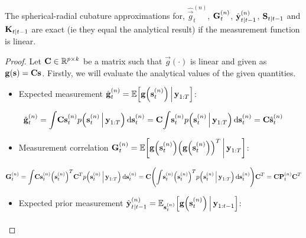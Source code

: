		\begin{theorem}
			The spherical-radial cubature approximations for, \( \hat{\vec{g}}_t^{(n)} \), \( \boldsymbol{\mathrm{G}}_t^{(n)} \), \( \hat{\boldsymbol{\mathrm{y}}}_{t \vert t - 1}^{(n)} \), \( \boldsymbol{\mathrm{S}}_{t \vert t - 1} \) and \( \boldsymbol{\mathrm{K}}_{t \vert t - 1} \) are exact (\ac{ie} they equal the analytical result) if the measurement function is linear.
		\end{theorem}
		\begin{proof}
			Let \( \boldsymbol{\mathrm{C}} \in \mathbb{R}^{p \times k} \) be a matrix such that \( \vec{g}(\cdot) \) is linear and given as \( \boldsymbol{\mathrm{g}}(\boldsymbol{\mathrm{s}}) = \boldsymbol{\mathrm{C}} \boldsymbol{\mathrm{s}} \). Firstly, we will evaluate the analytical values of the given quantities.
			\begin{itemize}
				\item Expected measurement \( \hat{\boldsymbol{\mathrm{g}}}_t^{(n)} = \mathbb{E}\Big[\boldsymbol{\mathrm{g}}\Big(\boldsymbol{\mathrm{s}}_t^{(n)}\Big) \,\Big\vert\, \boldsymbol{\mathrm{y}}_{1:T}\Big] \):
			\end{itemize}
			\begin{align*}
				\hat{\boldsymbol{\mathrm{g}}}_t^{(n)}
					= \int\! \boldsymbol{\mathrm{C}} \boldsymbol{\mathrm{s}}_t^{(n)} p\Big( \boldsymbol{\mathrm{s}}_t^{(n)} \,\Big\vert\, \boldsymbol{\mathrm{y}}_{1:T} \Big) \dd{\boldsymbol{\mathrm{s}}_t^{(n)}}
					= \boldsymbol{\mathrm{C}} \! \int\! \boldsymbol{\mathrm{s}}_t^{(n)} p\Big( \boldsymbol{\mathrm{s}}_t^{(n)} \,\Big\vert\, \boldsymbol{\mathrm{y}}_{1:T} \Big) \dd{\boldsymbol{\mathrm{s}}_t^{(n)}}
					= \boldsymbol{\mathrm{C}} \hat{\boldsymbol{\mathrm{s}}}_{t}^{(n)}
			\end{align*}
			\begin{itemize}
				\item Measurement correlation \( \boldsymbol{\mathrm{G}}_t^{(n)} = \mathbb{E}\bigg[\boldsymbol{\mathrm{g}}\Big(\boldsymbol{\mathrm{s}}_t^{(n)}\Big) \Big(\boldsymbol{\mathrm{g}}\Big(\boldsymbol{\mathrm{s}}_t^{(n)}\Big)\Big)^T \,\bigg\vert\, \boldsymbol{\mathrm{y}}_{1:T}\bigg] \):
			\end{itemize}
			\begin{align*}
				\boldsymbol{\mathrm{G}}_t^{(n)}
					= \int\! \boldsymbol{\mathrm{C}} \boldsymbol{\mathrm{s}}_t^{(n)} \Big(\boldsymbol{\mathrm{s}}_t^{(n)}\Big)^T \boldsymbol{\mathrm{C}}^T p\Big( \boldsymbol{\mathrm{s}}_t^{(n)} \,\Big\vert\, \boldsymbol{\mathrm{y}}_{1:T} \Big) \dd{\boldsymbol{\mathrm{s}}_t^{(n)}}
					= \boldsymbol{\mathrm{C}} \Bigg(\! \int\! \boldsymbol{\mathrm{s}}_t^{(n)} \Big(\boldsymbol{\mathrm{s}}_t^{(n)}\Big)^T p\Big( \boldsymbol{\mathrm{s}}_t^{(n)} \,\Big\vert\, \boldsymbol{\mathrm{y}}_{1:T} \Big) \dd{\boldsymbol{\mathrm{s}}_t^{(n)}} \!\Bigg) \boldsymbol{\mathrm{C}}^T
					= \boldsymbol{\mathrm{C}} \boldsymbol{\mathrm{P}}_t^{(n)} \boldsymbol{\mathrm{C}}^T
			\end{align*}
			\begin{itemize}
				\item Expected prior measurement \( \hat{\boldsymbol{\mathrm{y}}}_{t \vert t - 1}^{(n)} = \mathbb{E}_{\boldsymbol{\mathrm{s}}_t^{(n)}}\Big[\boldsymbol{\mathrm{g}}\Big(\boldsymbol{\mathrm{s}}_t^{(n)}\Big) \,\Big\vert\, \boldsymbol{\mathrm{y}}_{1:t - 1}\Big] \):
			\end{itemize}
			\begin{align*}

\end{align*}
\end{proof}

